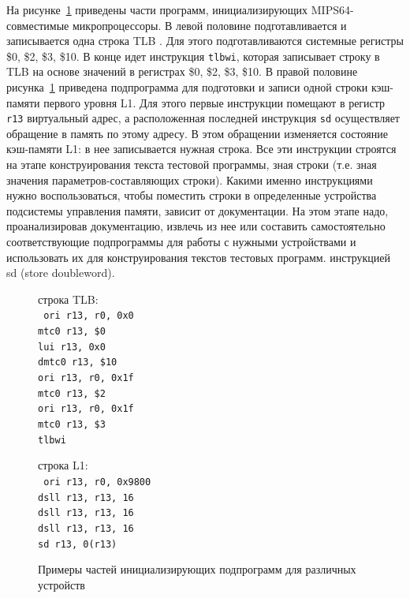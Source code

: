 На рисунке~\ref{fig:blocks_init_examples} приведены части программ, инициализирующих MIPS64-совместимые микропроцессоры. В левой половине подготавливается и записывается одна строка TLB . Для этого подготавливаются системные регистры \$0, \$2, \$3, \$10. В конце идет инструкция \texttt{tlbwi}, которая записывает строку в TLB на основе значений в регистрах \$0, \$2, \$3, \$10. В правой половине рисунка~\ref{fig:blocks_init_examples} приведена подпрограмма для подготовки и записи одной строки кэш-памяти первого уровня L1. Для этого первые инструкции помещают в регистр \texttt{r13} виртуальный адрес, а расположенная последней инструкция \texttt{sd} осуществляет обращение в память по этому адресу. В этом обращении изменяется состояние кэш-памяти L1: в нее записывается нужная строка. Все эти инструкции строятся на этапе конструирования текста тестовой программы, зная строки (т.е. зная значения параметров-составляющих строки). Какими именно инструкциями нужно воспользоваться, чтобы поместить строки в определенные устройства подсистемы управления памяти, зависит от документации. На этом этапе надо, проанализировав документацию, извлечь из нее или составить самостоятельно соответствующие подпрограммы для работы с нужными устройствами и использовать их для конструирования текстов тестовых программ.  инструкцией sd (store doubleword).

\begin{figure}[h] \centering
\parbox{0.4\textwidth}{
строка TLB:\\
{\small \tt
    ori r13, r0, 0x0\\
    mtc0 r13, \$0\\
    lui r13, 0x0\\
    dmtc0 r13, \$10\\
    ori r13, r0, 0x1f\\
    mtc0 r13, \$2\\
    ori r13, r0, 0x1f\\
    mtc0 r13, \$3\\
    tlbwi\\}
} \qquad
\parbox{0.4\textwidth}{
строка L1:\\
{\small \tt
    ori r13, r0, 0x9800\\
    dsll r13, r13, 16\\
    dsll r13, r13, 16\\
    dsll r13, r13, 16\\
    sd r13, 0(r13)\\}
} \caption{Примеры частей инициализирующих подпрограмм для различных устройств}\label{fig:blocks_init_examples}
\end{figure}



